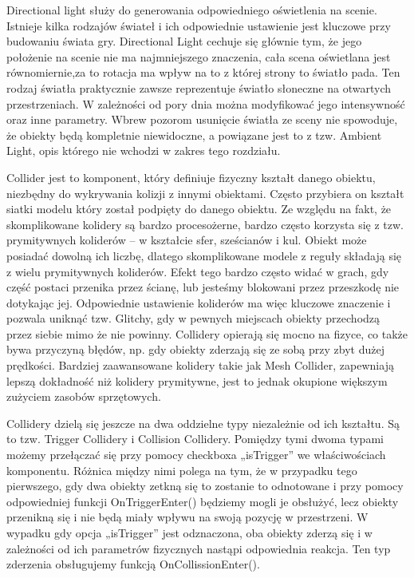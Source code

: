 \documentclass[12pt]{xmgr}
\begin{document}
Directional light służy do generowania odpowiedniego oświetlenia na scenie. Istnieje kilka rodzajów świateł i ich odpowiednie ustawienie jest kluczowe przy budowaniu świata gry. Directional Light cechuje się głównie tym, że jego położenie na scenie nie ma najmniejszego znaczenia, cała scena oświetlana jest równomiernie,za to rotacja ma wpływ na to z której strony to światło pada. Ten rodzaj światła praktycznie zawsze reprezentuje światło słoneczne na otwartych przestrzeniach. W zależności od pory dnia można modyfikować jego intensywność oraz inne parametry. Wbrew pozorom usunięcie światła ze sceny nie spowoduje, że obiekty będą kompletnie niewidoczne, a powiązane jest to z tzw. Ambient Light, opis którego nie wchodzi w zakres tego rozdziału.

Collider jest to komponent, który definiuje fizyczny kształt danego obiektu, niezbędny do wykrywania kolizji z innymi obiektami. Często przybiera on kształt siatki modelu który został podpięty do danego obiektu. Ze względu na fakt, że skomplikowane kolidery są bardzo procesożerne, bardzo często korzysta się z tzw. prymitywnych koliderów – w kształcie sfer, sześcianów i kul. Obiekt może posiadać dowolną ich liczbę, dlatego skomplikowane modele z reguły składają się z wielu prymitywnych koliderów. Efekt tego bardzo często widać w grach, gdy część postaci przenika przez ścianę, lub jesteśmy blokowani przez przeszkodę nie dotykając jej. Odpowiednie ustawienie koliderów ma więc kluczowe znaczenie i pozwala uniknąć tzw. Glitchy, gdy w pewnych miejscach obiekty przechodzą przez siebie mimo że nie powinny. Collidery opierają się mocno na fizyce, co także bywa przyczyną błędów, np. gdy obiekty zderzają się ze sobą przy zbyt dużej prędkości. Bardziej zaawansowane kolidery takie jak Mesh Collider, zapewniają lepszą dokładność niż kolidery prymitywne, jest to jednak okupione większym zużyciem zasobów sprzętowych.

Collidery dzielą się jeszcze na dwa  oddzielne typy niezależnie od ich kształtu. Są to tzw. Trigger Collidery i Collision Collidery. Pomiędzy tymi dwoma typami możemy przełączać się przy pomocy checkboxa „isTrigger” we właściwościach komponentu. Różnica między nimi polega na tym, że w przypadku tego pierwszego, gdy dwa obiekty zetkną się to zostanie to odnotowane i przy pomocy odpowiedniej funkcji OnTriggerEnter() będziemy mogli je obsłużyć, lecz obiekty przenikną się i nie będą miały wpływu na swoją pozycję w przestrzeni. W wypadku gdy opcja „isTrigger” jest odznaczona, oba obiekty zderzą się i w zależności od ich parametrów fizycznych nastąpi odpowiednia reakcja. Ten typ zderzenia obsługujemy funkcją OnCollissionEnter().
\end{document}
